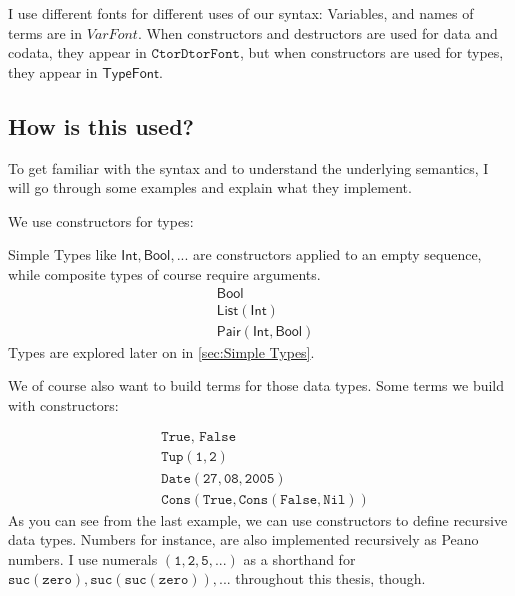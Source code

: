 \documentclass[twoside,12pt,a4paper]{article}
\begin{document}
I use different fonts for different uses of our syntax: 
Variables, and names of terms are in $VarFont$. When constructors and destructors are used for data and codata, they appear in $\mathtt{CtorDtorFont}$, 
but when constructors are used for types, they appear in $\mathsf{TypeFont}$.

\subsection{How is this used?}

To get familiar with the syntax and to understand the underlying semantics, 
I will go through some examples and explain what they implement.

We use constructors for types:
\begin{example}
    Simple Types like $\mathsf{Int, Bool, ...}$ are constructors applied to an empty sequence, 
    while composite types of course require arguments.
    \begin{align*}
        &\mathsf{Bool}\tag{1}\\
        &\mathsf{List(Int)}\tag{2}\\
        &\mathsf{Pair(Int, Bool)}\tag{3}
    \end{align*}
    Types are explored later on in \cref{sec:Simple Types}.
\end{example}

We of course also want to build terms for those data types. 
Some terms we build with constructors:

\begin{example}
    \begin{align*}
        &\texttt{True, False}\tag{1}\\
        &\mathtt{Tup(1,2)}\tag{2}\\
        &\mathtt{Date(27, 08, 2005)}\tag{3}\\
        &\mathtt{Cons(True, Cons(False, Nil))}\tag{4}              
    \end{align*}
    As you can see from the last example, we can use constructors to define recursive data types.
    Numbers for instance, are also implemented recursively as Peano numbers.
    I use numerals $(\mathtt{1, 2, 5, ...})$ as a shorthand for $\mathtt{suc(zero), suc(suc(zero)), ...}$ throughout this thesis, though.
\end{example}
\end{document}

